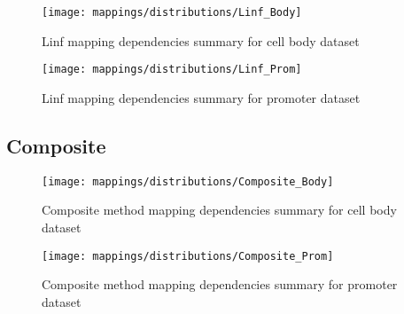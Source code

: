 \begin{figure}[H]
	\centering
	\texttt{[image: mappings/distributions/Linf\_Body]}
	\caption{Linf mapping dependencies summary for cell body dataset}
	\label{fig:map_body_linf}
\end{figure}

\begin{figure}[H]
	\centering
	\texttt{[image: mappings/distributions/Linf\_Prom]}
	\caption{Linf mapping dependencies summary for promoter dataset}
	\label{fig:map_prom_linf}
\end{figure}


\pagebreak
\subsection{Composite}

\begin{figure}[H]
	\centering
	\texttt{[image: mappings/distributions/Composite\_Body]}
	\caption{Composite method mapping dependencies summary for cell body dataset}
	\label{fig:map_body_comp}
\end{figure}

\begin{figure}[H]
	\centering
	\texttt{[image: mappings/distributions/Composite\_Prom]}
	\caption{Composite method mapping dependencies summary for promoter dataset}
	\label{fig:map_prom_comp}
\end{figure}